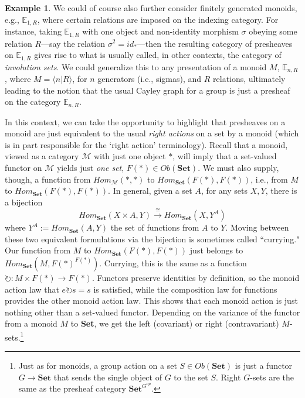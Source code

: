 \documentclass[11pt]{book}
\theoremstyle{definition}
\newtheorem{example}{Example}[section]
\theoremstyle{definition}
\theoremstyle{definition}
\theoremstyle{theorem}
\theoremstyle{definition}
\begin{document}
\begin{example}
		We could of course also further consider finitely generated monoids, e.g., $\mathbb{E}_{1,R}$, where certain relations are imposed on the indexing category. For instance, taking $\mathbb{E}_{1,R}$ with one object and non-identity morphism $\sigma$ obeying some relation $R$---say the relation $\sigma^2 = id_*$---then the resulting category of presheaves on $\mathbb{E}_{1,R}$ gives rise to what is usually called, in other contexts, the category of \textit{involution sets}. We could generalize this to any presentation of a monoid $M$, $\mathbb{E}_{n,R}$, where $M = \langle n | R \rangle$, for $n$ generators (i.e., sigmas), and $R$ relations, ultimately leading to the notion that the usual Cayley graph for a group is just a presheaf on the category $\mathbb{E}_{n, R}$.\par 
		In this context, we can take the opportunity to highlight that presheaves on a monoid are just equivalent to the usual \textit{right actions} on a set by a monoid (which is in part responsible for the `right action' terminology). Recall that a monoid, viewed as a category $\mathcal{M}$ with just one object $*$, will imply that a set-valued functor on $\mathcal{M}$ yields just \textit{one set}, $F(*) \in Ob(\textbf{Set})$. We must also supply, though, a function from $Hom_{\mathcal{M}}(*,*)$ to $Hom_{\textbf{Set}}(F(*), F(*))$, i.e., from $M$ to $Hom_{\textbf{Set}}(F(*), F(*))$. In general, given a set $A$, for any sets $X, Y$, there is a bijection 
		\begin{equation*}
		Hom_{\textbf{Set}}(X \times A, Y) \xrightarrow{\cong} Hom_{\textbf{Set}}(X, Y^A)
		\end{equation*} where $Y^A := Hom_{\textbf{Set}}(A, Y)$ the set of functions from $A$ to $Y$. Moving between these two equivalent formulations via the bijection is sometimes called ``currying." Our function from $M$ to $Hom_{\textbf{Set}}(F(*), F(*))$ just belongs to $Hom_{\textbf{Set}}(M, F(*)^{F(*)})$. Currying, this is the same as a function $\circlearrowright: M \times F(*) \rightarrow F(*)$. Functors preserve identities by definition, so the monoid action law that $e \circlearrowright s = s$ is satisfied, while the composition law for functions provides the other monoid action law. This shows that each monoid action is just nothing other than a set-valued functor. Depending on the variance of the functor from a monoid $M$ to \textbf{Set}, we get the left (covariant) or right (contravariant) $M$-sets.\footnote{Just as for monoids, a group action on a set $S \in Ob(\textbf{Set})$ is just a functor $G \rightarrow \textbf{Set}$ that sends the single object of $G$ to the set $S$. Right $G$-sets are the same as the presheaf category $\textbf{Set}^{G^{op}}$.} \par 

\end{example}
\end{document}
